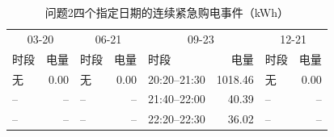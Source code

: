 \begin{table}[H]\centering\scriptsize
\caption{问题2四个指定日期的连续紧急购电事件（kWh）}\label{tab:q2_emergency}
\begin{tabular}{lrlrlrlr}\toprule
\multicolumn{2}{c}{03-20} & \multicolumn{2}{c}{06-21} & \multicolumn{2}{c}{09-23} & \multicolumn{2}{c}{12-21} \\
时段 & 电量 & 时段 & 电量 & 时段 & 电量 & 时段 & 电量 \\\midrule
无 & 0.00 & 无 & 0.00 & 20:20--21:30 & 1018.46 & 无 & 0.00 \\
-- & -- & -- & -- & 21:40--22:00 & 40.39 & -- & -- \\
-- & -- & -- & -- & 22:20--22:30 & 36.02 & -- & -- \\
\bottomrule\end{tabular}\end{table}
